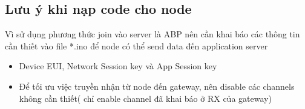 \subsection{Lưu ý khi nạp code cho node}

Vì sử dụng phương thức join vào server là ABP nên cần khai báo các thông tin cần thiết vào file *.ino để node có thể send data đến application server 

\begin{itemize}
    \item Device EUI, Network Session key và App Session key
    \item Để tối ưu việc truyền nhận từ node đến gateway,  nên disable các channels không cần thiết( chỉ enable channel đã khai báo ở RX của gateway)
\end{itemize}



